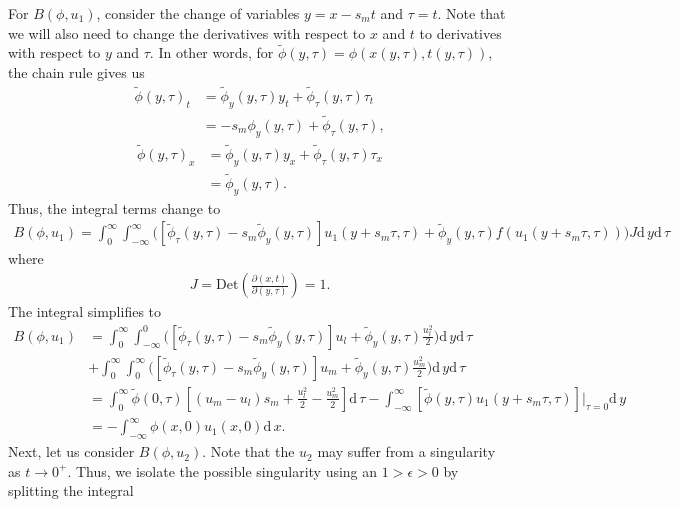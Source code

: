 \documentclass[10pt,letterpaper]{article}
\newcommand{\dif}[1][]{\mathrm{d} {#1}\,}
\newcommand{\frb}[1]{ \left(  {#1} \right) }
\theoremstyle{break}
\begin{document}
\begin{solution}
	For $B\frb{\phi,u_1}$, consider the change of variables $y = x - s_mt$ and $\tau = t$. Note that we will also need to change the derivatives with respect to $x$ and $t$ to derivatives with respect to $y$ and $\tau$. In other words, for $\widetilde \phi(y,\tau) = \phi(x(y,\tau),t(y,\tau))$, the chain rule gives us
	\begin{align*}
		\widetilde \phi(y,\tau)_t &=\widetilde \phi_y(y,\tau) y_t + \widetilde \phi_\tau(y,\tau) \tau_t\\
		&=
		-s_m \phi_y(y,\tau) + \widetilde \phi_\tau(y,\tau),
	\end{align*}
	\begin{align*}
		\widetilde \phi(y,\tau)_x &=\widetilde \phi_y(y,\tau) y_x + \widetilde \phi_\tau(y,\tau) \tau_x\\
		&= \widetilde \phi_y(y,\tau).
	\end{align*}
	Thus, the integral terms change to
	\begin{gather}
		B\frb{\phi,u_1}=\int_0^\infty \int_{-\infty}^\infty
				\Big( \left[ \widetilde \phi_\tau(y,\tau) -s_m \widetilde \phi_y(y,\tau)\right] u_1\frb{y+s_m \tau, \tau} + \widetilde \phi_y(y,\tau)  f(u_1\frb{y+s_m \tau, \tau}) \Big)
			J \dif y\dif \tau\ 
	\end{gather}
	where
	\begin{gather}
		J = \text{Det} \left( \frac{\partial(x,t)}{\partial(y,\tau)} \right) = 1.
	\end{gather}
	The integral simplifies to
	\begin{align} \label{Bsum1}
		B\frb{\phi,u_1}&=\int_0^\infty \int_{-\infty}^0
				\Big( \left[ \widetilde \phi_\tau(y,\tau) -s_m \widetilde \phi_y(y,\tau)\right] u_l + \widetilde \phi_y(y,\tau)  \frac{u_l^2}{2} \Big)
			 \dif y\dif \tau\  \\
			 & + \int_0^\infty \int_0^{\infty}
				\Big( \left[ \widetilde \phi_\tau(y,\tau) -s_m  \widetilde\phi_y(y,\tau)\right] u_m + \widetilde \phi_y(y,\tau)  \frac{u_m^2}{2} \Big)
			 \dif y\dif \tau\ \\
			 &= \int_0^\infty \widetilde \phi(0,\tau) \left[(u_m - u_l) s_m + \frac{u_l^2}{2} - \frac{u_m^2}{2} \right] \dif \tau - \int_{-\infty}^{\infty} \left[\widetilde \phi(y,\tau) u_1(y+s_m \tau,\tau) \right]\Big|_{\tau=0} \dif y\\
			 &= - \int_{-\infty}^{\infty} \phi(x,0) u_1(x,0) \dif x.
	\end{align}
	Next, let us consider $B\frb{\phi,u_2}$. Note that the $u_2$ may suffer from a singularity as $t \rightarrow 0^+$. Thus, we isolate the possible singularity using an $1>\epsilon > 0$ by splitting the integral

\end{solution}
\end{document}

